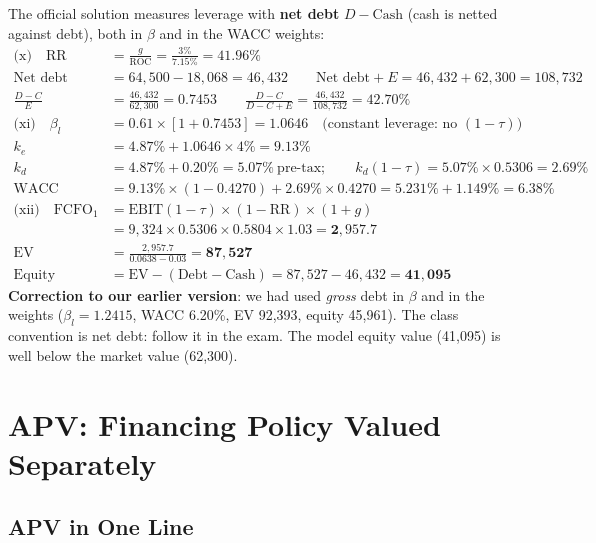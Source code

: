 \begin{exbox}
The official solution measures leverage with \textbf{net debt} $D-\text{Cash}$ (cash is netted against debt), both in $\beta$ and in the WACC weights:
\begin{align*}
\text{(x)}\quad \text{RR} &= \frac{g}{\text{ROC}} = \frac{3\%}{7.15\%} = \mathbf{41.96\%}\\
\text{Net debt} &= 64{,}500-18{,}068 = 46{,}432\qquad \text{Net debt}+E = 46{,}432+62{,}300=108{,}732\\
\frac{D-C}{E} &= \frac{46{,}432}{62{,}300}=0.7453\qquad \frac{D-C}{D-C+E}=\frac{46{,}432}{108{,}732}=42.70\%\\
\text{(xi)}\quad \beta_l &= 0.61\times[1+0.7453] = \mathbf{1.0646}\quad\text{(constant leverage: no }(1-\tau)\text{)}\\
k_e &= 4.87\%+1.0646\times4\% = \mathbf{9.13\%}\\
k_d &= 4.87\%+0.20\% = \mathbf{5.07\%}\ \text{pre-tax};\qquad k_d(1-\tau)=5.07\%\times0.5306=2.69\%\\
\text{WACC} &= 9.13\%\times(1-0.4270)+2.69\%\times0.4270 = 5.231\%+1.149\% = \mathbf{6.38\%}\\
\text{(xii)}\quad \text{FCFO}_1 &= \text{EBIT}(1-\tau)\times(1-\text{RR})\times(1+g)\\
&= 9{,}324\times0.5306\times0.5804\times1.03 = \mathbf{2{,}957.7}\\
\text{EV} &= \frac{2{,}957.7}{0.0638-0.03} = \mathbf{87{,}527}\\
\text{Equity} &= \text{EV}-(\text{Debt}-\text{Cash}) = 87{,}527-46{,}432 = \mathbf{41{,}095}
\end{align*}
\footnotesize \textbf{Correction to our earlier version}: we had used \emph{gross} debt in $\beta$ and in the weights ($\beta_l=1.2415$, WACC 6.20\%, EV 92,393, equity 45,961). The class convention is net debt: follow it in the exam. The model equity value (41,095) is well below the market value (62,300).
\end{exbox}

\section{APV: Financing Policy Valued Separately}

\subsection[APV in One Line]{APV in One Line }

